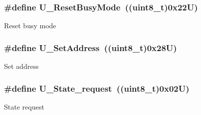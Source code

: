 \subsubsection[{\texorpdfstring{U\+\_\+\+Reset\+Busy\+Mode}{U_ResetBusyMode}}]{\setlength{\rightskip}{0pt plus 5cm}\#define U\+\_\+\+Reset\+Busy\+Mode~((uint8\+\_\+t)0x22\+U)}\hypertarget{group___u_a_r_t___control___to_gadddb4434f9a2e47ed320bc3bd39eec0c}{}\label{group___u_a_r_t___control___to_gadddb4434f9a2e47ed320bc3bd39eec0c}
Reset busy mode 
\subsubsection[{\texorpdfstring{U\+\_\+\+Set\+Address}{U_SetAddress}}]{\setlength{\rightskip}{0pt plus 5cm}\#define U\+\_\+\+Set\+Address~((uint8\+\_\+t)0x28\+U)}\hypertarget{group___u_a_r_t___control___to_ga1b727950a6079fa1f299e08204ad8923}{}\label{group___u_a_r_t___control___to_ga1b727950a6079fa1f299e08204ad8923}
Set address 
\subsubsection[{\texorpdfstring{U\+\_\+\+State\+\_\+request}{U_State_request}}]{\setlength{\rightskip}{0pt plus 5cm}\#define U\+\_\+\+State\+\_\+request~((uint8\+\_\+t)0x02\+U)}\hypertarget{group___u_a_r_t___control___to_ga8dda3117e8869a900e5c5fe6f1b3a768}{}\label{group___u_a_r_t___control___to_ga8dda3117e8869a900e5c5fe6f1b3a768}
State request 
